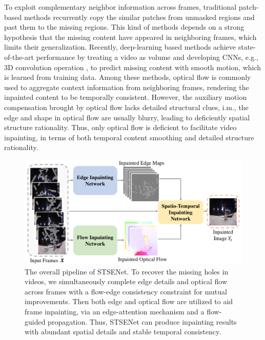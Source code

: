 \documentclass[letterpaper]{article} %
\begin{document}
To exploit complementary neighbor information across frames, traditional patch-based methods \cite{patwardhan2007video,wexler2004space,newson2014video} recurrently copy the similar patches from unmasked regions and past them to the missing regions. 
This kind of methods depends on a strong hypothesis that the missing content have appeared in neighboring frames, which limits their generalization.
Recently, deep-learning based methods achieve state-of-the-art performance by treating a video as volume and developing CNNs, e.g., 3D convolution operation \cite{wang2019video}, to predict missing content with smooth motion, which is learned from training data.
Among these methods, optical flow is commonly used \cite{Xu_2019_CVPR,Kim_2019_CVPR,Kim_2019_CVPR1} to aggregate context information from neighboring frames, rendering the inpainted content to be temporally consistent.
However, the auxiliary motion compensation brought by optical flow lacks detailed structural clues, i.m., the edge and shape in optical flow are usually blurry, leading to deficiently spatial structure rationality.
Thus, only optical flow is deficient to facilitate video inpainting, in terms of both temporal content smoothing and detailed structure rationality.




\begin{figure}[t]
	\centering
	\includegraphics[width=1.0\columnwidth]{zong} %
	\caption{The overall pipeline of STSENet. To recover the missing holes in videos, we simultaneously complete edge details and optical flow across frames with a flow-edge consistency constraint for mutual improvements. Then both edge and optical flow are utilized to aid frame inpainting, via an edge-attention mechanism and a flow-guided propagation. Thus, STSENet can produce inpainting results with abundant spatial details and stable temporal consistency.}
	\label{zong}
\end{figure}
\end{document}

